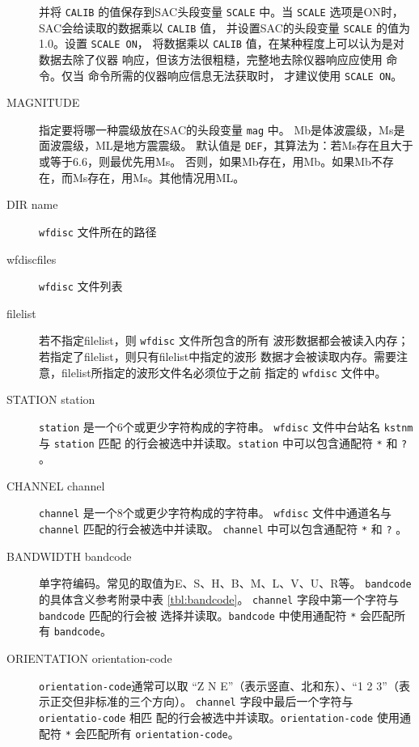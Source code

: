 \begin{description}
    并将 \texttt{CALIB} 的值保存到SAC头段变量 \texttt{SCALE} 中。当
    \texttt{SCALE} 选项是ON时，SAC会给读取的数据乘以 \texttt{CALIB} 值，
    并设置SAC的头段变量 \texttt{SCALE} 的值为1.0。设置 \texttt{SCALE ON}，
    将数据乘以 \texttt{CALIB} 值，在某种程度上可以认为是对数据去除了仪器
    响应，但该方法很粗糙，完整地去除仪器响应应使用 
    命令。仅当  命令所需的仪器响应信息无法获取时，
    才建议使用 \texttt{SCALE ON}。
\item [MAGNITUDE] 指定要将哪一种震级放在SAC的头段变量 \texttt{mag} 中。
    Mb是体波震级，Ms是面波震级，ML是地方震震级。
    默认值是 \texttt{DEF}，其算法为：若Ms存在且大于或等于6.6，则最优先用Ms。
    否则，如果Mb存在，用Mb。如果Mb不存在，而Ms存在，用Ms。其他情况用ML。
\item [DIR name] \texttt{wfdisc} 文件所在的路径
\item [wfdiscfiles] \texttt{wfdisc} 文件列表
\item [filelist] 若不指定filelist，则 \texttt{wfdisc} 文件所包含的所有
    波形数据都会被读入内存；若指定了filelist，则只有filelist中指定的波形
    数据才会被读取内存。需要注意，filelist所指定的波形文件名必须位于之前
    指定的 \texttt{wfdisc} 文件中。
\item[STATION station] \texttt{station} 是一个6个或更少字符构成的字符串。
    \texttt{wfdisc} 文件中台站名 \texttt{kstnm} 与 \texttt{station} 匹配
    的行会被选中并读取。\texttt{station} 中可以包含通配符 \texttt{*} 和
    \texttt{?} 。
\item[CHANNEL channel]  \texttt{channel} 是一个8个或更少字符构成的字符串。
    \texttt{wfdisc} 文件中通道名与 \texttt{channel} 匹配的行会被选中并读取。
    \texttt{channel} 中可以包含通配符 \texttt{*} 和 \texttt{?} 。
\item [BANDWIDTH bandcode] 单字符编码。常见的取值为E、S、H、B、M、L、V、U、R等。
    \texttt{bandcode} 的具体含义参考附录中表 \ref{tbl:bandcode}。
    \texttt{channel} 字段中第一个字符与 \texttt{bandcode} 匹配的行会被
    选择并读取。\texttt{bandcode} 中使用通配符 \texttt{*} 会匹配所有
    \texttt{bandcode}。
\item [ORIENTATION orientation-code] \texttt{orientation-code}通常可以取
    ``Z N E''（表示竖直、北和东）、``1 2 3''（表示正交但非标准的三个方向）。
    \texttt{channel} 字段中最后一个字符与 \texttt{orientatio-code} 相匹
    配的行会被选中并读取。\texttt{orientation-code} 使用通配符 \texttt{*}
    会匹配所有 \texttt{orientation-code}。
\end{description}

